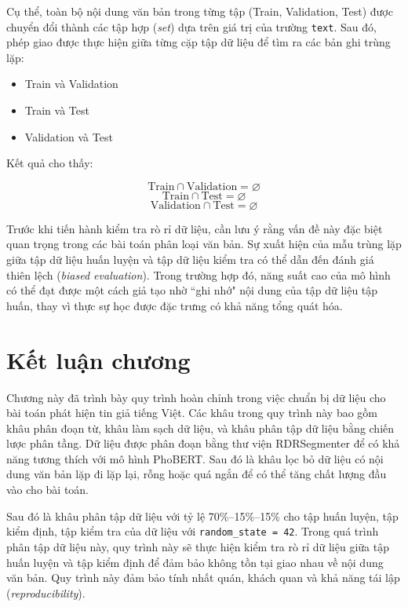 \documentclass[12pt, a4paper]{report}
\begin{document}
Cụ thể, toàn bộ nội dung văn bản trong từng tập (Train, Validation, Test) được chuyển đổi thành các tập hợp (\textit{set}) dựa trên giá trị của trường \texttt{text}. Sau đó, phép giao được thực hiện giữa từng cặp tập dữ liệu để tìm ra các bản ghi trùng lặp:

\begin{itemize}
    \item Train và Validation
    \item Train và Test
    \item Validation và Test
\end{itemize}

Kết quả cho thấy:

\[
\text{Train} \cap \text{Validation} = \varnothing
\]
\[
\text{Train} \cap \text{Test} = \varnothing
\]
\[
\text{Validation} \cap \text{Test} = \varnothing
\]

Trước khi tiến hành kiểm tra rò rỉ dữ liệu, cần lưu ý rằng vấn đề này đặc biệt quan trọng trong các bài toán phân loại văn bản. Sự xuất hiện của mẫu trùng lặp giữa tập dữ liệu huấn luyện và tập dữ liệu kiểm tra có thể dẫn đến đánh giá thiên lệch (\textit{biased evaluation}). Trong trường hợp đó, năng suất cao của mô hình có thể đạt được một cách giả tạo nhờ ``ghi nhớ" nội dung của tập dữ liệu tập huấn, thay vì thực sự học được đặc trưng có khả năng tổng quát hóa.

\section{Kết luận chương}

Chương này đã trình bày quy trình hoàn chỉnh trong việc chuẩn bị dữ liệu cho bài toán 
phát hiện tin giả tiếng Việt. Các khâu trong quy trình này bao gồm khâu phân đoạn 
từ, khâu làm sạch dữ liệu, và khâu phân tập dữ liệu bằng chiến lược phân tầng. 
Dữ liệu được phân đoạn bằng thư viện RDRSegmenter để có khả năng tương thích với 
mô hình PhoBERT. Sau đó là khâu lọc bỏ dữ liệu có nội dung văn bản lặp đi lặp lại, 
rỗng hoặc quá ngắn để có thể tăng chất lượng đầu vào cho bài toán. 

Sau đó là khâu phân tập dữ liệu với tỷ lệ 70\%–15\%–15\% cho tập huấn luyện, tập 
kiểm định, tập kiểm tra của dữ liệu với \texttt{random\_state = 42}. Trong quá trình 
phân tập dữ liệu này, quy trình này sẽ thực hiện kiểm tra rò rỉ dữ liệu giữa tập huấn 
luyện và tập kiểm định để đảm bảo không tồn tại giao nhau về nội dung văn bản. 
Quy trình này đảm bảo tính nhất quán, khách quan và khả năng tái lập (\textit{reproducibility}).
\end{document}
